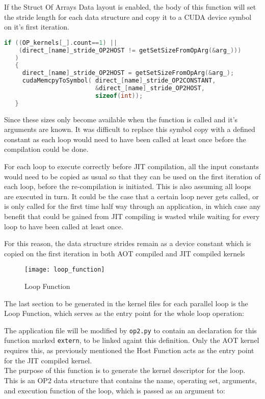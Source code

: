 If the Struct Of Arrays Data layout is enabled, the body of this function will set the stride length for each data structure and copy it to a CUDA device symbol on it's first iteration.
\begin{lstlisting}[linewidth = \textwidth, framesep=0pt,escapechar=:, language=C,backgroundcolor=\color{red!20}]
if ((OP_kernels[_].count==1) ||
    (direct_[name]_stride_OP2HOST != getSetSizeFromOpArg(&arg_)))
   )
   {
     direct_[name]_stride_OP2HOST = getSetSizeFromOpArg(&arg_);
     cudaMemcpyToSymbol( direct_[name]_stride_OP2CONSTANT,
                         &direct_[name]_stride_OP2HOST,
                         sizeof(int));
   }
\end{lstlisting}


Since these sizes only become available when the function is called and it's arguments are known. It was difficult to replace this symbol copy with a defined constant as each loop would need to have been called at least once before the compilation could be done.
\par
For each loop to execute correctly before JIT compilation, all the input constants would need to be copied as usual so that they can be used on the first iteration of each loop, before the re-compilation is initiated. This is also assuming all loops are executed in turn. It could be the case that a certain loop never gets called, or is only called for the first time half way through an application, in which case any benefit that could be gained from JIT compiling is wasted while waiting for every loop to have been called at least once.
\par
For this reason, the data structure strides remain as a device constant which is copied on the first iteration in both AOT compiled and JIT compiled kernels

\begin{wrapfigure}{r}{.33\textwidth}
  \centering
  \caption{Loop Function}
  \label{fig:loop_func}
  \texttt{[image: loop\_function]}
\end{wrapfigure}
The last section to be generated in the kernel files for each parallel loop is the Loop Function, which serves as the entry point for the whole loop operation:

\noindent The application file will be modified by \verb|op2.py| to contain an declaration for this function marked \verb|extern|, to be linked againt this definition. Only the AOT kernel requires this, as previously mentioned the Host Function acts as the entry point for the JIT compiled kernel.
\\
The purpose of this function is to generate the kernel descriptor for the loop. This is an OP2 data structure that contains the name, operating set, arguments, and execution function of the loop, which is passed as an argument to:

